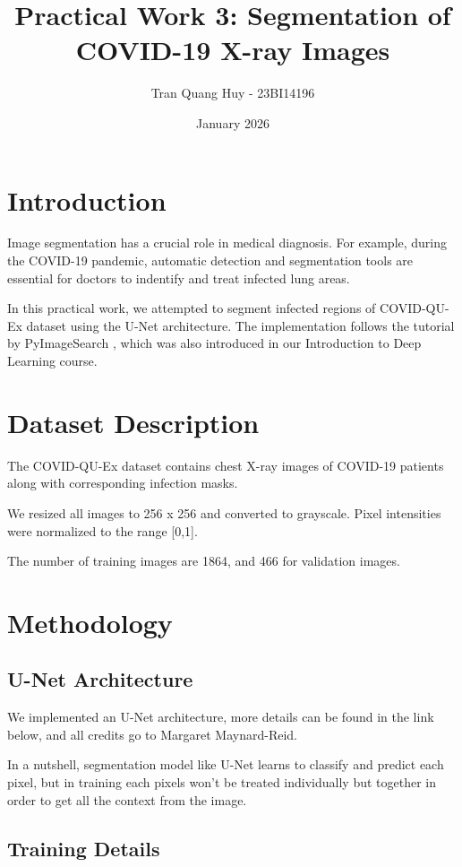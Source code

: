 \documentclass[10pt,twocolumn]{article}
\title{\textbf{Practical Work 3: Segmentation of COVID-19 X-ray Images}}
\author{Tran Quang Huy - 23BI14196}
\date{January 2026}
\begin{document}
\maketitle

\section{Introduction}

Image segmentation has a crucial role in medical diagnosis. For example, during the COVID-19 pandemic, automatic detection and segmentation tools are essential for doctors to indentify and treat infected lung areas.

In this practical work, we attempted to segment infected regions of COVID-QU-Ex dataset \cite{covid_qu_ex} using the U-Net architecture. The implementation follows the tutorial by PyImageSearch \cite{pyimagesearch_unet}, which was also introduced in our Introduction to Deep Learning course.

\section{Dataset Description}

The COVID-QU-Ex dataset contains chest X-ray images of COVID-19 patients along with corresponding infection masks.

We resized all images to 256 x 256 and converted to grayscale. 
Pixel intensities were normalized to the range [0,1].

The number of training images are 1864, and 466 for validation images.

\section{Methodology}

\subsection{U-Net Architecture}

We implemented an U-Net architecture, more details can be found in the link below, and all credits go to Margaret Maynard-Reid. 

In a nutshell, segmentation model like U-Net learns to classify and predict each pixel, but in training each pixels won't be treated individually but together in order to get all the context from the image.

\subsection{Training Details}
\end{document}
